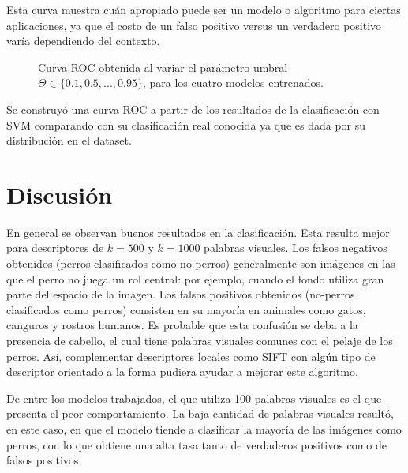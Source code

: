 \documentclass[12pt]{article}
\begin{document}
Esta curva muestra
cuán apropiado puede ser un modelo o algoritmo para ciertas aplicaciones, ya que
el costo de un falso positivo versus un verdadero positivo varía dependiendo del
contexto.

\begin{figure}[h]
    \centering

    \caption{Curva ROC obtenida al variar el parámetro umbral $\Theta \in \{ 0.1,0.5,...,0.95\}$, para los cuatro modelos entrenados.}
\end{figure}

Se construyó una curva ROC a partir de los resultados de la clasificación con SVM comparando con su clasificación real conocida ya que es dada por su distribución en el dataset.

\section{Discusión}

En general se observan buenos resultados en la clasificación. Esta resulta mejor
para descriptores de $k=500$ y $k=1000$ palabras visuales.  Los falsos negativos
obtenidos (perros clasificados como no-perros) generalmente son imágenes en las
que el perro no juega un rol central: por ejemplo, cuando el fondo utiliza gran parte del
espacio de la imagen. Los falsos positivos obtenidos (no-perros clasificados
como perros) consisten en su mayoría en animales como gatos, canguros y rostros
humanos. Es probable que esta confusión se deba a la presencia de cabello, el
cual tiene palabras visuales comunes con el pelaje de los perros. Así,
complementar descriptores locales como SIFT con algún tipo de descriptor
orientado a la forma pudiera ayudar a mejorar este algoritmo.

De entre los modelos trabajados, el que utiliza 100 palabras visuales es el que
presenta el peor comportamiento. La baja cantidad de palabras visuales resultó,
en este caso, en que el modelo tiende a clasificar la mayoría de las imágenes
como perros, con lo que obtiene una alta tasa tanto de verdaderos positivos como
de falsos positivos.
\end{document}
